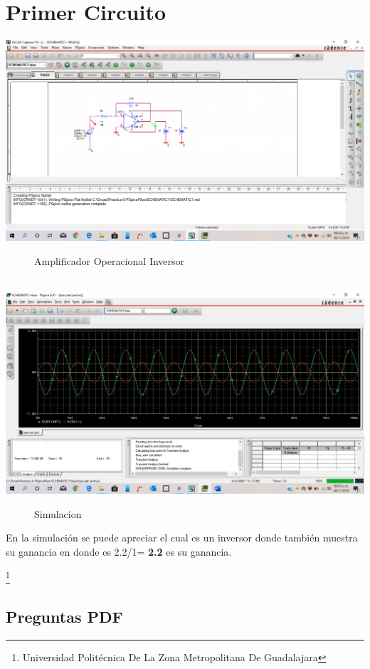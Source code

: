 \documentclass[10pt,a4paper]{article}
\begin{document}
\section{Primer Circuito}
\begin{center}
 \includegraphics[scale=0.3]{1.png}
 \begin{figure}[hbtp]
 \caption{Amplificador Operacional Inversor}
 \centering
 \end{figure}\\
  \includegraphics[scale=0.3]{2.png}
 \begin{figure}[hbtp]
 \caption{Simulacion}
 \centering
 \end{figure} 
\end{center}

En la simulación se puede apreciar el cual es un inversor donde también muestra su ganancia en donde es 2.2/1= \textbf{2.2} es su ganancia.

\footnote{Universidad Politécnica De La Zona Metropolitana De Guadalajara} 

\newpage

\subsection{Preguntas PDF}
\end{document}
